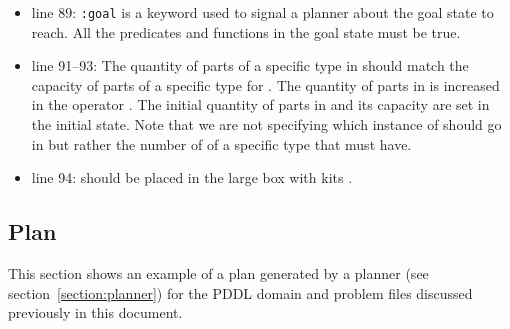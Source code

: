 \begin{itemize}
\item line 89: \texttt{:goal} is a keyword used to signal a planner about the goal state to reach. All the predicates and functions in the goal state must be true.
\item line 91--93: The quantity of parts of a specific type in  should match the capacity of parts of a specific type for . The quantity of parts in  is increased in the operator . The initial quantity of parts in  and its capacity are set in the initial state. Note that we are not specifying which instance of  should go in  but rather the number of  of a specific type that  must have.
\item line 94:  should be placed in the large box with kits .
\end{itemize}

\subsection{Plan}
This section shows an example of a plan generated by a planner (see section~\ref{section:planner}) for the PDDL domain and problem files discussed previously in this document.

